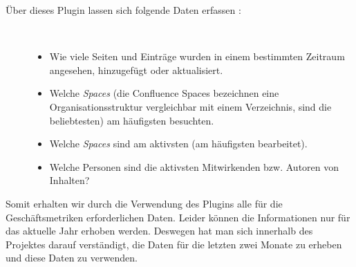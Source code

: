 \documentclass[a4paper,12pt]{scrartcl}
\begin{document}
\begin{description}
   \item[Über dieses Plugin lassen sich folgende Daten erfassen \cite{Plugin}:]~\par
   \begin{itemize}
      \item Wie viele Seiten und Einträge wurden in einem bestimmten Zeitraum angesehen, hinzugefügt oder aktualisiert. 
      \item Welche \textit{Spaces} (die Confluence Spaces bezeichnen eine Organisationsstruktur vergleichbar mit einem Verzeichnis, sind die beliebtesten) am häufigsten besuchten.
      \item Welche \textit{Spaces} sind am aktivsten (am häufigsten bearbeitet).
      \item Welche Personen sind die aktivsten Mitwirkenden bzw. Autoren von Inhalten? 
   \end{itemize}
\end{description} 
Somit erhalten wir durch die Verwendung des Plugins alle für die Geschäftsmetriken erforderlichen Daten. Leider können die Informationen nur für das aktuelle Jahr erhoben werden. Deswegen hat man sich innerhalb des Projektes darauf verständigt, die Daten für die letzten zwei Monate zu erheben und diese Daten zu verwenden.









 























  
\newpage
\listoftables
\listoffigures
\newpage

\end{document}
